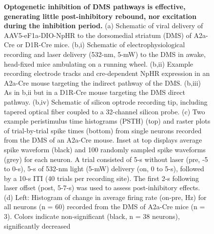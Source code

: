 \begin{figure}[t!]
\begin{center}
    \caption[Optogenetic inhibition of DMS pathways is effective, generating little post-inhibitory rebound, nor excitation during the inhibition period]{\textbf{Optogenetic inhibition of DMS pathways is effective, generating little post-inhibitory rebound, nor excitation during the inhibition period.} (a) Schematic of viral delivery of AAV5-eF1a-DIO-NpHR to the dorsomedial striatum (DMS) of A2a-Cre or D1R-Cre mice. (b,i) Schematic of electrophysiological recording and laser delivery (532-nm, 5-mW) to the DMS in awake, head-fixed mice ambulating on a running wheel. (b,ii) Example recording electrode tracks and cre-dependent NpHR expression in an A2a-Cre mouse targeting the indirect pathway of the DMS. (b,iii) As in b,ii but in a D1R-Cre mouse targeting the DMS direct pathway. (b,iv) Schematic of silicon optrode recording tip, including tapered optical fiber coupled to a 32-channel silicon probe. (c) Two example peristimulus time histograms (PSTH) (top) and raster plots of trial-by-trial spike times (bottom) from single neurons recorded from the DMS of an A2a-Cre mouse. Inset at top displays average spike waveform (black) and 100 randomly sampled spike waveforms (grey) for each neuron. A trial consisted of 5-s without laser (pre, -5 to 0-s), 5-s of 532-nm light (5-mW) delivery (on, 0 to 5-s), followed by a 10-s ITI (40 trials per recording site). The first 2-s following laser offset (post, 5-7-s) was used to assess post-inhibitory effects. (d) Left: Histogram of change in average firing rate (on-pre, Hz) for all neurons (n = 60) recorded from the DMS of A2a-Cre mice (n = 3). Colors indicate non-significant (black, n = 38 neurons), significantly decreased }
    \label{fig:ap1:ext1}
  \end{center}
  \vspace{-1.5cm}
\end{figure}
